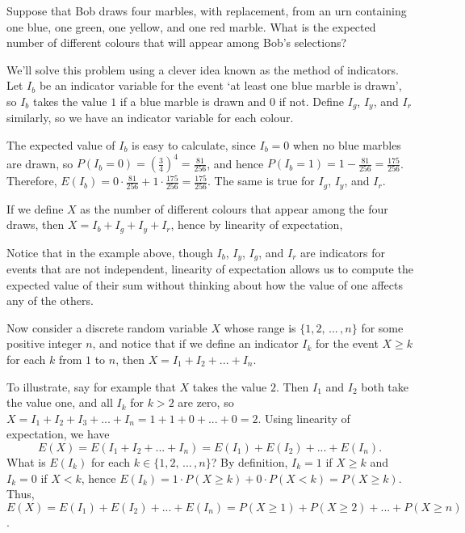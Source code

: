 \begin{examp}
Suppose that Bob draws four marbles, with replacement, from an urn containing one blue, one green, one yellow, and one red marble. What is the expected number of different colours that will appear among Bob's selections?
\par
\noindent We'll solve this problem using a clever idea known as the method of indicators. Let $I_b$ be an indicator variable for the event `at least one blue marble is drawn', so $I_b$ takes the value $1$ if a blue marble is drawn and $0$ if not. Define $I_g$, $I_y$, and $I_r$ similarly, so we have an indicator variable for each colour.
\par
\noindent The expected value of $I_b$ is easy to calculate, since $I_b = 0$ when no blue marbles are drawn, so $P(I_b = 0) = (\frac{3}{4})^4 = \frac{81}{256}$, and hence $P(I_b = 1) = 1 - \frac{81}{256} = \frac{175}{256}$. Therefore, $E(I_b) = 0 \cdot \frac{81}{256} + 1 \cdot \frac{175}{256} =\frac{175}{256}$. The same is true for $I_g$, $I_y$, and $I_r$.
\par
\noindent If we define $X$ as the number of different colours that appear among the four draws, then $X = I_b + I_g + I_y + I_r$, hence by linearity of expectation,
\end{examp}
\par
Notice that in the example above, though $I_b$, $I_y$, $I_g$, and $I_r$ are indicators for events that are not independent, linearity of expectation allows us to compute the expected value of their sum without thinking about how the value of one affects any of the others.
\par
Now consider a discrete random variable $X$ whose range is $\{1,2,\,...\,,n\}$ for some positive integer $n$, and notice that if we define an indicator $I_k$ for the event $X \geq k$ for each $k$ from $1$ to $n$, then $X = I_1 + I_2 + ... + I_n.$
\par
To illustrate, say for example that $X$ takes the value $2$. Then $I_1$ and $I_2$ both take the value one, and all $I_k$ for $k > 2$ are zero, so $X = I_1 + I_2 + I_3 + ... + I_n = 1 + 1 + 0 + ... + 0 = 2$. Using linearity of expectation, we have $$E(X) = E(I_1 + I_2 + ... + I_n) = E(I_1) + E(I_2) + ... + E(I_n).$$
What is $E(I_k)$ for each $k \in \{1,2,\,...\,,n\}$? By definition, $I_k = 1$ if $X \geq k$ and $I_k = 0$ if $X < k$, hence $E(I_k) = 1\cdot P(X \geq k) + 0\cdot P(X<k) = P(X \geq k)$. Thus, $E(X) = E(I_1) + E(I_2) + ... + E(I_n) = P(X\geq 1) +P(X\geq 2) + ... + P(X\geq n)$.

